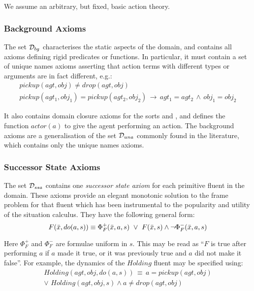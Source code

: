 We assume an arbitrary, but fixed, basic action theory.


\subsubsection{Background Axioms}

The set $\mathcal{D}_{bg}$ characterises the static aspects of the domain,
and contains all axioms defining rigid predicates or functions. In
particular, it must contain a set of unique names axioms asserting
that action terms with different types or arguments are in fact different,
e.g.:\begin{gather*}
pickup(agt,obj)\neq drop(agt,obj)\\
pickup(agt_{1},obj_{1})=pickup(agt_{2},obj_{2})\,\rightarrow\, agt_{1}=agt_{2}\,\wedge\, obj_{1}=obj_{2}\end{gather*}


It also contains domain closure axioms for the sorts  and , and defines the function $actor(a)$ to
give the agent performing an action. The background axioms are a generalisation
of the set $\mathcal{D}_{una}$ commonly found in the literature, which contains
only the unique names axioms.


\subsubsection{Successor State Axioms}

The set $\mathcal{D}_{ssa}$ contains one \emph{successor state axiom} for
each primitive fluent in the domain. These axioms provide an elegant
monotonic solution to the frame problem for that fluent \citep{reiter91frameprob}
which has been instrumental to the popularity and utility of the situation
calculus. They have the following general form: \[
F(\bar{x},do(a,s))\equiv\Phi_{F}^{+}(\bar{x},a,s)\,\,\vee\,\, F(\bar{x},s)\wedge\neg\Phi_{F}^{-}(\bar{x},a,s)\]


Here $\Phi_{F}^{+}$ and $\Phi_{F}^{-}$ are formulae uniform in $s$.
This may be read as {}``$F$ is true after performing $a$ if $a$
made it true, or it was previously true and $a$ did not make it false''.
For example, the dynamics of the $Holding$ fluent may be specified
using:\begin{multline*}
Holding(agt,obj,do(a,s))\,\equiv\, a=pickup(agt,obj)\\
\vee\,\, Holding(agt,obj,s)\wedge a\neq drop(agt,obj)\end{multline*}


